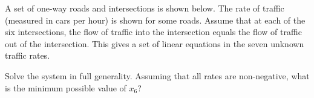 
% 










\endedxvertical




A set of one-way roads and intersections is shown below.  The rate of traffic (measured in cars per hour) is shown for some roads.  
Assume that at each of the six intersections, 
the flow of traffic into the intersection equals the flow of traffic
out of the intersection.  This gives a set of linear equations in the seven unknown traffic rates.  


\begin{center}

\end{center}


Solve the system in full generality.  Assuming that all rates are non-negative, what is the minimum possible value of $x_6$?  


